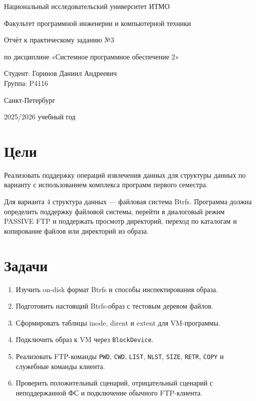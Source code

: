 \documentclass[a4paper,12pt]{article}
\begin{document}
\begin{titlepage}
\centering
{\large Национальный исследовательский университет ИТМО\par}
{\large Факультет программной инженерии и компьютерной техники\par}
\vspace{4cm}
{\large Отчёт к практическому заданию №3\par}
{\large по дисциплине «Системное программное обеспечение 2»\par}
\vfill
\begin{flushright}
Студент: Горинов Даниил Андреевич\\
Группа: P4116
\end{flushright}
\vfill
{Санкт-Петербург}\par
{2025/2026 учебный год\par}
\end{titlepage}

\clearpage
{}

\section{Цели}
Реализовать поддержку операций извлечения данных для структуры данных по варианту с использованием комплекса программ первого семестра.

Для варианта 4 структура данных — файловая система Btrfs. Программа должна определить поддержку файловой системы, перейти в диалоговый режим PASSIVE FTP и поддержать просмотр директорий, переход по каталогам и копирование файлов или директорий из образа.

\section{Задачи}
\begin{enumerate}
\item Изучить on-disk формат Btrfs и способы инспектирования образа.
\item Подготовить настоящий Btrfs-образ с тестовым деревом файлов.
\item Сформировать таблицы inode, dirent и extent для VM-программы.
\item Подключить образ к VM через \texttt{BlockDevice}.
\item Реализовать FTP-команды \texttt{PWD}, \texttt{CWD}, \texttt{LIST}, \texttt{NLST}, \texttt{SIZE}, \texttt{RETR}, \texttt{COPY} и служебные команды клиента.
\item Проверить положительный сценарий, отрицательный сценарий с неподдержанной ФС и подключение обычного FTP-клиента.
\end{enumerate}
\end{document}
